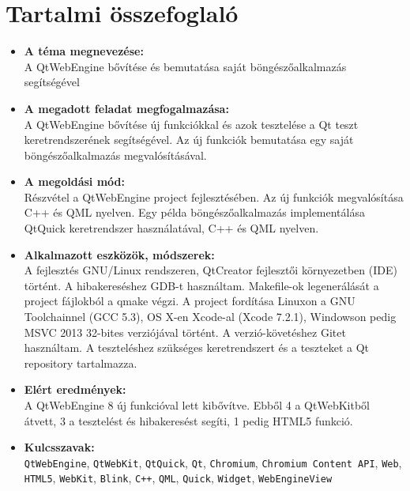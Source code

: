 \documentclass[12pt]{report}
\def\title{A QtWebEngine bővítése és bemutatása saját böngészőalkalmazás segítségével}
\begin{document}
\chapter*{Tartalmi összefoglaló}
\begin{itemize}
    \item \textbf{A téma megnevezése:} \\
        \title
    \item \textbf{A megadott feladat megfogalmazása:} \\
        A QtWebEngine bővítése új funkciókkal és azok tesztelése a
        Qt teszt keretrendszerének segítségével. Az új funkciók bemutatása
        egy saját böngészőalkalmazás megvalósításával.
    \item \textbf{A megoldási mód:} \\
        Részvétel a QtWebEngine project fejlesztésében. Az új funkciók
        megvalósítása C++ és QML nyelven. Egy példa böngészőalkalmazás implementálása
        QtQuick keretrendszer használatával, C++ és QML nyelven.
    \item \textbf{Alkalmazott eszközök, módszerek:} \\
        A fejlesztés GNU/Linux rendszeren, QtCreator fejlesztői
        környezetben (IDE) történt. A hibakereséshez GDB-t használtam.
        Makefile-ok legenerálását a project fájlokból a qmake végzi.
        A project fordítása Linuxon a GNU Toolchainnel (GCC 5.3),
        OS X-en Xcode-al (Xcode 7.2.1), Windowson pedig
        MSVC 2013 32-bites verziójával történt. A verzió-követéshez Gitet
        használtam. A teszteléshez szükséges keretrendszert és a teszteket a Qt
        repository tartalmazza.
    \item \textbf{Elért eredmények:} \\
        A QtWebEngine 8 új funkcióval lett kibővítve. Ebből 4 a QtWebKitből
        átvett, 3 a tesztelést és hibakeresést segíti, 1 pedig HTML5 funkció.
    \item \textbf{Kulcsszavak:} \\
        \texttt{QtWebEngine}, \texttt{QtWebKit}, \texttt{QtQuick}, \texttt{Qt},
        \texttt{Chromium}, \texttt{Chromium Content API}, \texttt{Web}, \texttt{HTML5},
        \texttt{WebKit}, \texttt{Blink}, \texttt{C++}, \texttt{QML}, \texttt{Quick},
        \texttt{Widget}, \texttt{WebEngineView}
\end{itemize}

\end{document}
